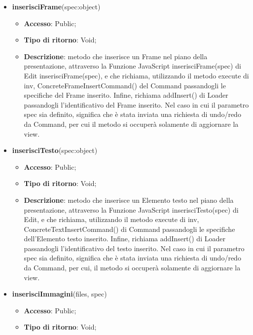 {{\begin{itemize}
\begin{itemize}
			\end{itemize}
			\item \textbf{inserisciFrame}(spec:object)
			\begin{itemize}
				\item \textbf{Accesso}: Public;
				\item \textbf{Tipo di ritorno}: Void;
				\item \textbf{Descrizione}: metodo che inserisce un Frame nel piano della presentazione, attraverso la Funzione\ped{g} JavaScript inserisciFrame(spec) di Edit inserisciFrame(spec), e che richiama, utilizzando il metodo execute di inv, ConcreteFrameInsertCommand() del Command passandogli le specifiche del Frame inserito. Infine, richiama addInsert() di Loader passandogli l'identificativo del Frame inserito. Nel caso in cui il parametro spec sia definito, significa che è stata inviata una richiesta di undo/redo da Command, per cui il metodo si occuperà solamente di aggiornare la view.
			\end{itemize}
			\item \textbf{inserisciTesto}(spec:object)
			\begin{itemize}
				\item \textbf{Accesso}: Public;
				\item \textbf{Tipo di ritorno}: Void;
				\item \textbf{Descrizione}: metodo che inserisce un Elemento testo nel piano della presentazione, attraverso la Funzione\ped{g} JavaScript inserisciTesto(spec) di Edit, e che richiama, utilizzando il metodo execute di inv, ConcreteTextInsertCommand() di Command passandogli le specifiche dell'Elemento testo inserito. Infine, richiama addInsert() di Loader passandogli l'identificativo del testo inserito. Nel caso in cui il parametro spec sia definito, significa che è stata inviata una richiesta di undo/redo da Command, per cui, il metodo si occuperà solamente di aggiornare la view.
			\end{itemize}
			\item \textbf{inserisciImmagini}(files, spec)
			\begin{itemize}
				\item \textbf{Accesso}: Public;
				\item \textbf{Tipo di ritorno}: Void;

\end{itemize}
\end{itemize}}}
